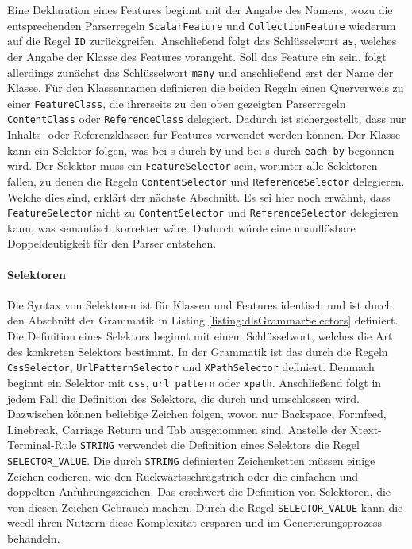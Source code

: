    Eine Deklaration eines Features beginnt mit der Angabe des Namens,
    wozu die entsprechenden Parserregeln \texttt{ScalarFeature} und \texttt{CollectionFeature}
    wiederum auf die Regel \texttt{ID} zurückgreifen.    
    Anschließend folgt das Schlüsselwort \texttt{as}, welches der Angabe der Klasse
    des Features vorangeht.
    Soll das Feature ein {\collectionFeature} sein, folgt allerdings zunächst das
    Schlüsselwort \texttt{many} und anschließend erst der Name der Klasse.
    Für den Klassennamen definieren die beiden Regeln einen Querverweis zu einer \texttt{FeatureClass},
    die ihrerseits zu den oben gezeigten Parserregeln \texttt{ContentClass} oder
    \texttt{ReferenceClass} delegiert.
    Dadurch ist sichergestellt, dass nur Inhalts- oder Referenzklassen für Features verwendet werden können.
    Der Klasse kann ein Selektor folgen,
    was bei {\scalarFeature}s durch \texttt{by} und bei
    {\collectionFeature}s durch \texttt{each by} begonnen wird.
    Der Selektor muss ein \texttt{FeatureSelector} sein,
    worunter alle Selektoren fallen, zu denen die Regeln \texttt{ContentSelector}
    und \texttt{ReferenceSelector} delegieren.
    Welche dies sind, erklärt der nächste Abschnitt.
    Es sei hier noch erwähnt, dass \texttt{FeatureSelector} nicht zu
    \texttt{ContentSelector} und \texttt{ReferenceSelector} delegieren kann,
    was semantisch korrekter wäre.
    Dadurch würde eine unauflösbare Doppeldeutigkeit für den Parser entstehen.

    \paragraph*{Selektoren}
    Die Syntax von Selektoren ist für Klassen und Features identisch
    und ist durch den Abschnitt der Grammatik in Listing \ref{listing:dlsGrammarSelectors} definiert.
    Die Definition eines Selektors beginnt mit einem Schlüsselwort,
    welches die Art des konkreten Selektors bestimmt.
    In der Grammatik ist das durch die Regeln
    \texttt{CssSelector}, \texttt{UrlPatternSelector} und \texttt{XPathSelector} definiert.
    Demnach beginnt ein Selektor mit \texttt{css}, \texttt{url pattern} oder \texttt{xpath}.
    Anschließend folgt in jedem Fall die Definition des Selektors,
    die durch {\flqq } und {\frqq } umschlossen wird.
    Dazwischen können beliebige Zeichen folgen, wovon
    nur Backspace, Formfeed, Linebreak, Carriage Return und Tab ausgenommen sind.
    Anstelle der Xtext-Terminal-Rule \texttt{STRING} \cite[Kapitel "`Common Terminals"']{xtext:documentation}
    verwendet die Definition eines Selektors die Regel \texttt{SELECTOR\_VALUE}.
    Die durch \texttt{STRING} definierten Zeichenketten müssen einige Zeichen codieren,
    wie den Rückwärtsschrägstrich oder die einfachen und doppelten Anführungszeichen.
    Das erschwert die Definition von Selektoren, die von diesen Zeichen Gebrauch machen.
    Durch die Regel \texttt{SELECTOR\_VALUE} kann die \gls{wccdl} ihren Nutzern diese Komplexität
    ersparen und im Generierungsprozess behandeln.

